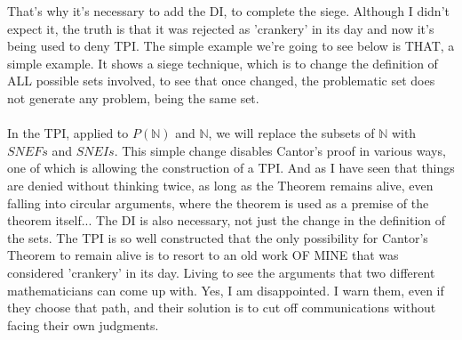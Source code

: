 	\noindent
	That's why it's necessary to add the DI, to complete the siege. Although I didn't expect it, the truth is that it was rejected as 'crankery' in its day and now it's being used to deny TPI. The simple example we're going to see below is THAT, a simple example. It shows a siege technique, which is to change the definition of ALL possible sets involved, to see that once changed, the problematic set does not generate any problem, being the same set.\\\\ 
	
	\noindent
	In the TPI, applied to $P(\mathbb{N})$ and $\mathbb{N}$, we will replace the subsets of $\mathbb{N}$ with $SNEFs$ and $SNEIs$. This simple change disables Cantor's proof in various ways, one of which is allowing the construction of a TPI. And as I have seen that things are denied without thinking twice, as long as the Theorem remains alive, even falling into circular arguments, where the theorem is used as a premise of the theorem itself... The DI is also necessary, not just the change in the definition of the sets. The TPI is so well constructed that the only possibility for Cantor's Theorem to remain alive is to resort to an old work OF MINE that was considered 'crankery' in its day. Living to see the arguments that two different mathematicians can come up with. Yes, I am disappointed. I warn them, even if they choose that path, and their solution is to cut off communications without facing their own judgments.\\\\
	

